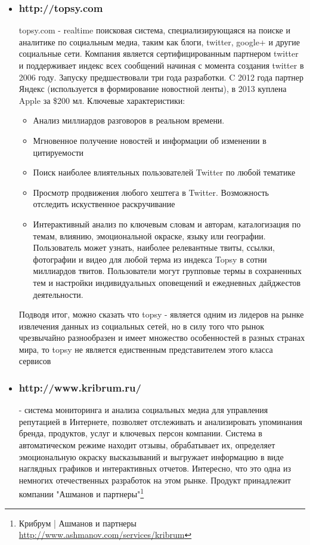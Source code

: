 \begin{itemize}
\item \subsubsection{http://topsy.com}
topsy.com - realtime поисковая система, специализирующаяся на поиске и аналитике по социальным медиа, таким как блоги, twitter, google+ и другие социальные сети. Компания является сертифицированным партнером twitter и поддерживает индекс всех сообщений начиная с момента создания twitter в 2006 году. Запуску предшествовали три года разработки. C 2012 года партнер Яндекс (используется в формирование новостной ленты), в 2013 куплена Apple за  \$200 мл. Ключевые характеристики:
\begin{itemize}
\item Анализ миллиардов разговоров в реальном времени.
\item Мгновенное получение новостей и информации об изменении в цитируемости
\item Поиск наиболее влиятельных пользователей Twitter по любой тематике
\item Просмотр продвижения любого хештега в Twitter. Возможность отследить искуственное раскручивание
\item Интерактивный анализ по ключевым словам и авторам, каталогизация по темам, влиянию, эмоциональной окраске, языку или географии. Пользователь может узнать, наиболее релевантные твиты, ссылки, фотографии и видео для любой терма из индекса Topsy в сотни миллиардов твитов. Пользователи могут групповые термы в сохраненных тем и настройки индивидуальных оповещений и ежедневных дайджестов деятельности.
\end{itemize}
Подводя итог, можно сказать что topsy - является одним из лидеров на рынке извлечения данных из социальных сетей, но в силу того что рынок чрезвычайно разнообразен и имеет множество особенностей в разных странах мира, то topsy не является едиственным представителем этого класса сервисов
\item \subsubsection{http://www.kribrum.ru/} - система мониторинга и анализа социальных медиа для управления репутацией в Интернете, позволяет отслеживать и анализировать упоминания бренда, продуктов, услуг и ключевых персон компании. Система в автоматическом режиме находит отзывы, обрабатывает их, определяет эмоциональную окраску высказываний и выгружает информацию в виде наглядных графиков и интерактивных отчетов. Интересно, что это одна из немногих отечественных разработок на этом рынке. Продукт принадлежит компании "Ашманов и партнеры"\footnote{Крибрум | Ашманов и партнеры \url{http://www.ashmanov.com/services/kribrum} }

\end{itemize}

